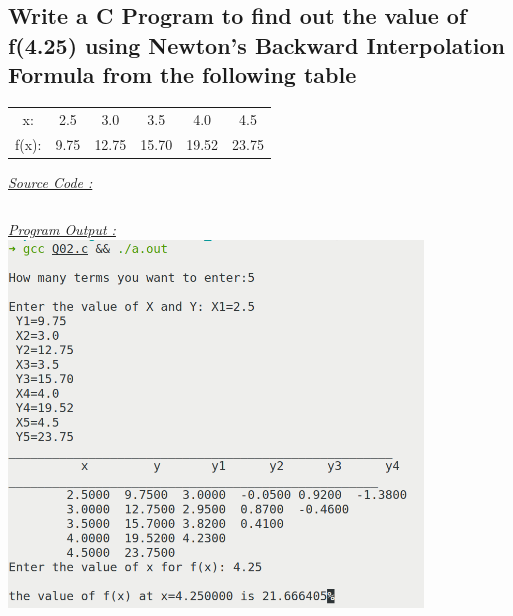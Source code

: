 \documentclass{report}
\begin{document}
\subsection{Write a C Program to find out the value of f(4.25) using Newton's Backward Interpolation Formula from the following table}
\begin{center}
\begin{tabular}{c|c|c|c|c|c}
  x: & 2.5 & 3.0 & 3.5 & 4.0 & 4.5 \\
  f(x): & 9.75 & 12.75 & 15.70 & 19.52 & 23.75 
\end{tabular}
\end{center}
\bigbreak
\underline{\emph{\Large Source Code :}}
\inputminted[breaklines]{c}{../codes/Q02.c}
\bigbreak
\noindent
\newpage
\underline{\emph{\Large Program Output :}}
\bigbreak
\noindent
\includegraphics[width=110mm,scale=0.5]{../outputs/light/Q02.png}
\end{document}
